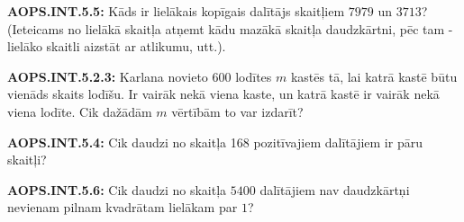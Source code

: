 \documentclass[11pt]{article}
\newenvironment{uzdevums}[1][\unskip]{%
\vspace{3mm}
\noindent
\textbf{#1:}
\noindent}
{}
\begin{document}
\begin{uzdevums}[AOPS.INT.5.5]
Kāds ir lielākais kopīgais dalītājs skaitļiem $7979$ un $3713$? (Ieteicams no lielākā skaitļa atņemt kādu mazākā skaitļa 
daudzkārtni, pēc tam - lielāko skaitli aizstāt ar atlikumu, utt.). 
\end{uzdevums}

\begin{uzdevums}[AOPS.INT.5.2.3]
Karlana novieto 600 lodītes $m$ kastēs tā, lai katrā kastē būtu vienāds skaits lodīšu. 
Ir vairāk nekā viena kaste, un katrā kastē ir vairāk nekā viena lodīte. 
Cik dažādām $m$ vērtībām to var izdarīt? 
\end{uzdevums}

\begin{uzdevums}[AOPS.INT.5.4]
Cik daudzi no skaitļa 168 pozitīvajiem dalītājiem ir pāru skaitļi?
\end{uzdevums}

\begin{uzdevums}[AOPS.INT.5.6]
Cik daudzi no skaitļa $5400$ dalītājiem nav daudzkārtņi nevienam pilnam kvadrātam lielākam par $1$? 
\end{uzdevums}
\end{document}
